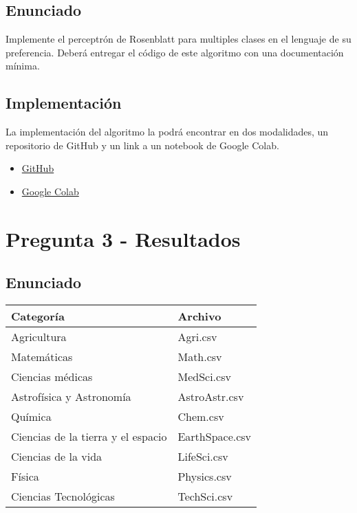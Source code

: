 \documentclass{article}
\theoremstyle{mytheoremstyle}
\theoremstyle{mytheoremstyle}
\theoremstyle{myproblemstyle}
\begin{document}
\subsection{Enunciado}
Implemente el perceptrón de Rosenblatt para multiples clases en el lenguaje de su preferencia. Deberá entregar el código de este algoritmo con una documentación mínima.
\subsection{Implementación}
La implementación del algoritmo la podrá encontrar en dos modalidades, un repositorio de GitHub y un link a un notebook de Google Colab.

\begin{itemize}
  \item \href{https://github.com/LeoGCode/Tarea-2--Perceptron/tree/master}{GitHub}
  \item \href{https://colab.research.google.com/drive/19HIDV-svO55OROQ8nh3c4EpypbrmDVmw?authuser=1#scrollTo=RFcFA9MZ0MEW}{Google Colab}
\end{itemize}


\section{Pregunta 3 - Resultados}

\subsection{Enunciado}

\begin{table}[h]
  \centering
  \begin{tabular}{ll}
    \hline
    \textbf{Categoría}                 & \textbf{Archivo} \\
    \hline
    Agricultura                        & Agri.csv         \\
    Matemáticas                        & Math.csv         \\
    Ciencias médicas                   & MedSci.csv       \\
    Astrofísica y Astronomía           & AstroAstr.csv    \\
    Química                            & Chem.csv         \\
    Ciencias de la tierra y el espacio & EarthSpace.csv   \\
    Ciencias de la vida                & LifeSci.csv      \\
    Física                             & Physics.csv      \\
    Ciencias Tecnológicas              & TechSci.csv      \\
    \hline
  \end{tabular}
\end{table}
\end{document}

